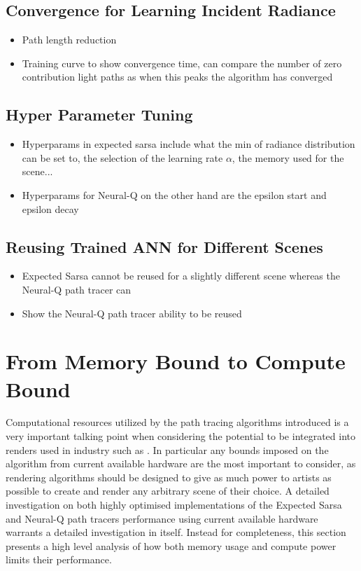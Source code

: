\documentclass[../dissertation.tex]{subfiles}
\begin{document}
\subsection{Convergence for Learning Incident Radiance}
\begin{itemize}
\item Path length reduction
\item Training curve to show convergence time, can compare the number of zero contribution light paths as when this peaks the algorithm has converged
\end{itemize}

\subsection{Hyper Parameter Tuning}
\begin{itemize}
\item Hyperparams in expected sarsa include what the min of radiance distribution can be set to, the selection of the learning rate $\alpha$, the memory used for the scene...
\item Hyperparams for Neural-Q on the other hand are the epsilon start and epsilon decay
\end{itemize}

\subsection{Reusing Trained ANN for Different Scenes}
\begin{itemize}
\item Expected Sarsa cannot be reused for a slightly different scene whereas the Neural-Q path tracer can 
\item Show the Neural-Q path tracer ability to be reused
\end{itemize}


\section{From Memory Bound to Compute Bound}

Computational resources utilized by the path tracing algorithms introduced is a very important talking point when considering the potential to be integrated into renders used in industry such as \cite{georgiev2018arnold, christensen2018renderman, hyperion}. In particular any bounds imposed on the algorithm from current available hardware are the most important to consider, as rendering algorithms should be designed to give as much power to artists as possible to create and render any arbitrary scene of their choice. A detailed investigation on both highly optimised implementations of the Expected Sarsa and Neural-Q path tracers performance using current available hardware warrants a detailed investigation in itself. Instead for completeness, this section presents a high level analysis of how both memory usage and compute power limits their performance.
\end{document}

